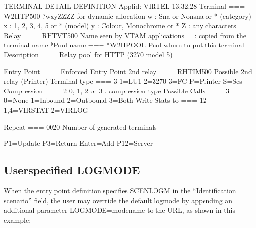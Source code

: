 \documentclass[letterpaper,10pt,english]{sphinxmanual}
\begin{document}
\begin{sphinxVerbatim}[commandchars=\\\{\}]
TERMINAL DETAIL DEFINITION \PYGZhy{}\PYGZhy{}\PYGZhy{}\PYGZhy{}\PYGZhy{}\PYGZhy{}\PYGZhy{}\PYGZhy{}\PYGZhy{}\PYGZhy{}\PYGZhy{}\PYGZhy{}\PYGZhy{}\PYGZhy{}\PYGZhy{}\PYGZhy{}\PYGZhy{}\PYGZhy{}\PYGZhy{}\PYGZhy{}\PYGZhy{}\PYGZhy{}\PYGZhy{}\PYGZhy{}\PYGZhy{} Applid: VIRTEL 13:32:28
Terminal ===\PYGZgt{} W2HTP500      ?wxyZZZZ for dynamic allocation
                            w : Sna or Non\PYGZhy{}sna or * (category)
                            x : 1, 2, 3, 4, 5 or * (model)
                            y : Colour, Monochrome or *
                            Z : any characters
Relay ===\PYGZgt{} RHTVT500         Name seen by VTAM applications
                            = : copied from the terminal name
*Pool name ===\PYGZgt{} *W2HPOOL    Pool where to put this terminal
Description ===\PYGZgt{} Relay pool for HTTP (3270 model 5)

Entry Point ===\PYGZgt{}            Enforced Entry Point
2nd relay ===\PYGZgt{} RHTIM500     Possible 2nd relay (Printer)
Terminal type ===\PYGZgt{} 3        1=LU1 2=3270 3=FC P=Printer S=Scs
Compression ===\PYGZgt{} 2          0, 1, 2 or 3 : compression type
Possible Calls ===\PYGZgt{} 3       0=None 1=Inbound 2=Outbound 3=Both
Write Stats to ===\PYGZgt{} 12      1,4=VIRSTAT 2=VIRLOG

Repeat ===\PYGZgt{} 0020            Number of generated terminals

P1=Update               P3=Return                           Enter=Add
                                                            P12=Server
\end{sphinxVerbatim}

\sphinxAtStartPar
{}

\ignorespaces 

\subsection{User\sphinxhyphen{}specified LOGMODE}
\label{\detokenize{Customization:user-specified-logmode}}\label{\detokenize{Customization:index-63}}
\sphinxAtStartPar
When the entry point definition specifies SCENLOGM in the “Identification scenario” field, the user may override the default logmode by appending an additional parameter LOGMODE=modename to the URL, as shown in this example:
\end{document}
